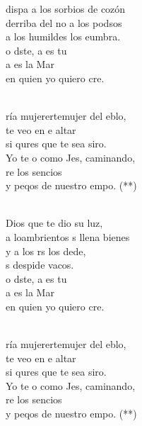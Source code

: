 \documentclass[12pt]{article}
\begin{document}
\begin{multicols*}{2}
\begin{cancion}
	dispa a los sorbios de cozón\\
	derriba del no a los podsos\\
	a los humildes los eumbra.\\
	o dste, a es tu \\
	a es la Mar \\
	en quien yo quiero cre.\\\jump\\
	\begin{chorus}%
	ría mujerertemujer del eblo,\\
	 te veo en e altar\\
	si qures que te sea siro.\\
	Yo te o como Jes, caminando, \\
	re los sencios \\
	y peqos de nuestro empo. (**) \\
	\end{chorus}%
	\jump\\
	 Dios que te dio su luz,\\
	a loambrientos s llena  bienes\\
	y a los rs los dede,\\
	s despide vacos.\\
	o dste, a es tu \\
	a es la Mar \\
	en quien yo quiero cre.\\\jump\\
	\begin{chorus}%
	ría mujerertemujer del eblo,\\
	 te veo en e altar\\
	si qures que te sea siro.\\
	Yo te o como Jes, caminando, \\
	re los sencios \\
	y peqos de nuestro empo. (**) \\
	\end{chorus}%
	\jump\\
\end{cancion}%


\end{multicols*}
\end{document}
